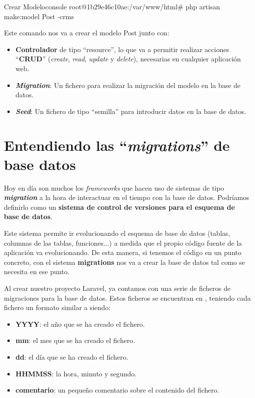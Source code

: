 \begin{mycode}{Crear Modelo}{console}{}
root@1b29e46c10ae:/var/www/html# php artisan make:model Post -crms
\end{mycode}

Este comando nos va a crear el modelo Post junto con:
\begin{itemize}
    \item \textbf{Controlador} de tipo “resource”, lo que va a permitir realizar acciones “\textbf{CRUD}” (\textit{create}, \textit{read}, \textit{update} y \textit{delete}), necesarias en cualquier aplicación web.
    \item \textbf{\textit{Migration}}: Un fichero para realizar la migración del modelo en la base de datos.
    \item \textbf{\textit{Seed}}: Un fichero de tipo “semilla” para introducir datos en la base de datos.
\end{itemize}


\chapter{Entendiendo las “\textit{migrations}” de base datos}

Hoy en día son muchos los \textit{frameworks} que hacen uso de sistemas de tipo \textbf{\textit{migration}} a la hora de interactuar en el tiempo con la base de datos. Podríamos definirlo como un \textbf{sistema de control de versiones para el esquema de base de datos}.

Este sistema permite ir evolucionando el esquema de base de datos (tablas, columnas de las tablas, funciones...) a medida que el propio código fuente de la aplicación va evolucionando. De esta manera, si tenemos el código en un punto concreto, con el sistema \textbf{migrations} nos va a crear la base de datos tal como se necesita en ese punto.

Al crear nuestro proyecto Laravel, ya contamos con una serie de ficheros de migraciones para la base de datos. Estos ficheros se encuentran en , teniendo cada fichero un formato similar a  siendo:

\begin{itemize}
    \item \textbf{YYYY}: el año que se ha creado el fichero.
    \item \textbf{mm}: el mes que se ha creado el fichero.
    \item \textbf{dd}: el día que se ha creado el fichero.
    \item \textbf{HHMMSS}: la hora, minuto y segundo.
    \item \textbf{comentario}: un pequeño comentario sobre el contenido del fichero.
\end{itemize}

